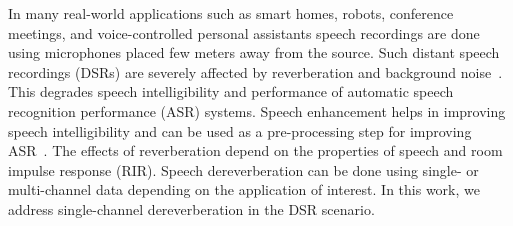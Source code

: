 \iffalse
In many real-world applications such as smart homes, robots, conference meetings, and voice-controlled personal assistants speech recordings are done using microphones placed few meters away from the source. Such distant speech recordings (DSRs) are severely affected by reverberation and background noise~\cite{naylor2010speech}. This degrades speech intelligibility and performance of automatic speech recognition performance (ASR) systems. Speech enhancement helps in improving speech intelligibility and can be used as a pre-processing step for improving ASR~\cite{kinoshita2016summary}. The effects of reverberation depend on the properties of speech and room impulse response (RIR). Speech dereverberation can be done using single- or multi-channel data depending on the application of interest. In this work, we address single-channel dereverberation in the DSR scenario.

